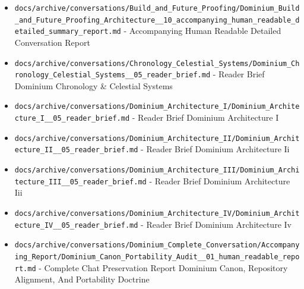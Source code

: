 \documentclass[10.5pt,a4paper,openany]{book}
\begin{document}
\begin{itemize}
\item \texttt{docs/\allowbreak{}archive/\allowbreak{}conversations/\allowbreak{}Build\_\allowbreak{}and\_\allowbreak{}Future\_\allowbreak{}Proofing/\allowbreak{}Dominium\_\allowbreak{}Build\_\allowbreak{}and\_\allowbreak{}Future\_\allowbreak{}Proofing\_\allowbreak{}Architecture\_\allowbreak{}\_\allowbreak{}10\_\allowbreak{}accompanying\_\allowbreak{}human\_\allowbreak{}readable\_\allowbreak{}detailed\_\allowbreak{}summary\_\allowbreak{}report.\allowbreak{}md} -\allowbreak{} Accompanying Human Readable Detailed Conversation Report
\item \texttt{docs/\allowbreak{}archive/\allowbreak{}conversations/\allowbreak{}Chronology\_\allowbreak{}Celestial\_\allowbreak{}Systems/\allowbreak{}Dominium\_\allowbreak{}Chronology\_\allowbreak{}Celestial\_\allowbreak{}Systems\_\allowbreak{}\_\allowbreak{}05\_\allowbreak{}reader\_\allowbreak{}brief.\allowbreak{}md} -\allowbreak{} Reader Brief Dominium Chronology \& Celestial Systems
\item \texttt{docs/\allowbreak{}archive/\allowbreak{}conversations/\allowbreak{}Dominium\_\allowbreak{}Architecture\_\allowbreak{}I/\allowbreak{}Dominium\_\allowbreak{}Architecture\_\allowbreak{}I\_\allowbreak{}\_\allowbreak{}05\_\allowbreak{}reader\_\allowbreak{}brief.\allowbreak{}md} -\allowbreak{} Reader Brief Dominium Architecture I
\item \texttt{docs/\allowbreak{}archive/\allowbreak{}conversations/\allowbreak{}Dominium\_\allowbreak{}Architecture\_\allowbreak{}II/\allowbreak{}Dominium\_\allowbreak{}Architecture\_\allowbreak{}II\_\allowbreak{}\_\allowbreak{}05\_\allowbreak{}reader\_\allowbreak{}brief.\allowbreak{}md} -\allowbreak{} Reader Brief Dominium Architecture Ii
\item \texttt{docs/\allowbreak{}archive/\allowbreak{}conversations/\allowbreak{}Dominium\_\allowbreak{}Architecture\_\allowbreak{}III/\allowbreak{}Dominium\_\allowbreak{}Architecture\_\allowbreak{}III\_\allowbreak{}\_\allowbreak{}05\_\allowbreak{}reader\_\allowbreak{}brief.\allowbreak{}md} -\allowbreak{} Reader Brief Dominium Architecture Iii
\item \texttt{docs/\allowbreak{}archive/\allowbreak{}conversations/\allowbreak{}Dominium\_\allowbreak{}Architecture\_\allowbreak{}IV/\allowbreak{}Dominium\_\allowbreak{}Architecture\_\allowbreak{}IV\_\allowbreak{}\_\allowbreak{}05\_\allowbreak{}reader\_\allowbreak{}brief.\allowbreak{}md} -\allowbreak{} Reader Brief Dominium Architecture Iv
\item \texttt{docs/\allowbreak{}archive/\allowbreak{}conversations/\allowbreak{}Dominium\_\allowbreak{}Complete\_\allowbreak{}Conversation/\allowbreak{}Accompanying\_\allowbreak{}Report/\allowbreak{}Dominium\_\allowbreak{}Canon\_\allowbreak{}Portability\_\allowbreak{}Audit\_\allowbreak{}\_\allowbreak{}01\_\allowbreak{}human\_\allowbreak{}readable\_\allowbreak{}report.\allowbreak{}md} -\allowbreak{} Complete Chat Preservation Report Dominium Canon, Repository Alignment, And Portability Doctrine

\end{itemize}
\end{document}
